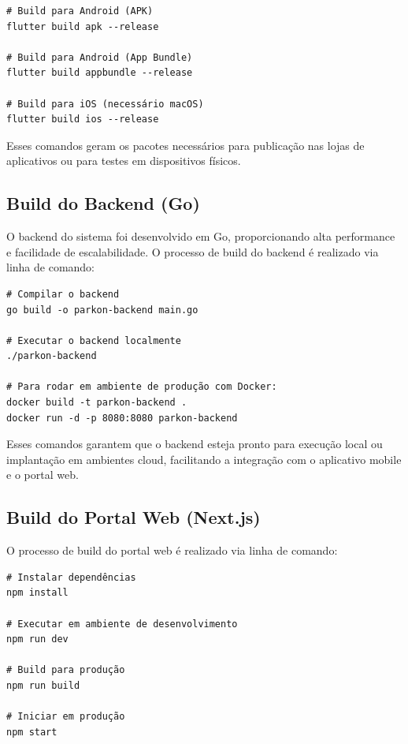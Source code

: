 \begin{verbatim}
# Build para Android (APK)
flutter build apk --release

# Build para Android (App Bundle)
flutter build appbundle --release

# Build para iOS (necessário macOS)
flutter build ios --release
\end{verbatim}

Esses comandos geram os pacotes necessários para publicação nas lojas de aplicativos ou para testes em dispositivos físicos.

\subsection{Build do Backend (Go)}
\label{sec:build-backend}

O backend do sistema foi desenvolvido em Go, proporcionando alta performance e facilidade de escalabilidade. O processo de build do backend é realizado via linha de comando:

\begin{verbatim}
# Compilar o backend
go build -o parkon-backend main.go

# Executar o backend localmente
./parkon-backend

# Para rodar em ambiente de produção com Docker:
docker build -t parkon-backend .
docker run -d -p 8080:8080 parkon-backend
\end{verbatim}

Esses comandos garantem que o backend esteja pronto para execução local ou implantação em ambientes cloud, facilitando a integração com o aplicativo mobile e o portal web.

\subsection{Build do Portal Web (Next.js)}
\label{sec:build-portal-web}

O processo de build do portal web é realizado via linha de comando:

\begin{verbatim}
# Instalar dependências
npm install

# Executar em ambiente de desenvolvimento
npm run dev

# Build para produção
npm run build

# Iniciar em produção
npm start
\end{verbatim}

